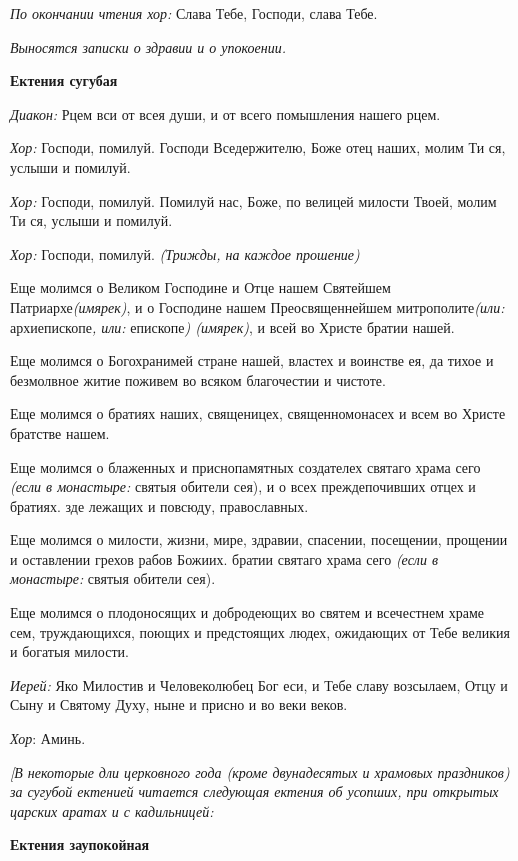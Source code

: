 {\itshape По окончании чтения хор:} Слава Тебе, Господи, слава Тебе.

{\itshape Выносятся записки о здравии и о упокоении.}

{\bfseries Ектения сугубая}

{\itshape Диакон:} Рцем вси от всея души, и от всего помышления нашего рцем.

{\itshape  Хор:} Господи, помилуй. Господи Вседержителю, Боже отец наших, молим Ти ся, услыши и помилуй.

{\itshape  Хор:} Господи, помилуй. Помилуй нас, Боже, по велицей милости Твоей, молим Ти ся, услыши и помилуй.

{\itshape  Хор:} Господи, помилуй. {\itshape (Трижды, на каждое прошение)} 

Еще молимся о Великом Господине и Отце нашем Святейшем Патриархе{\itshape  (имярек)}, и о Господине нашем Преосвященнейшем митрополите{\itshape  (или:} архиепископе{\itshape , или:} епископе{\itshape ) (имярек)}, и всей во Христе братии нашей. 

Еще молимся о Богохранимей стране нашей, властех и воинстве ея, да тихое и безмолвное житие поживем во всяком благочестии и чистоте. 

Еще молимся о братиях наших, священицех, священномонасех и всем во Христе братстве нашем.

Еще молимся о блаженных и приснопамятных создателех святаго храма сего {\itshape (если в монастыре:} святыя обители сея), и о всех преждепочивших отцех и братиях. зде лежащих и повсюду, православных. 

Еще молимся о милости, жизни, мире, здравии, спасении, посещении, прощении и оставлении грехов рабов Божиих. братии святаго храма сего {\itshape (если в монастыре:} святыя обители сея). 

Еще молимся о плодоносящих и добродеющих во святем и всечестнем храме сем, труждающихся, поющих и предстоящих людех, ожидающих от Тебе великия и богатыя милости.

{\itshape Иерей:} Яко Милостив и Человеколюбец Бог еси, и Тебе славу возсылаем, Отцу и Сыну и Святому Духу, ныне и присно и во веки веков.

{\itshape Хор}: Аминь.

{\itshape [В некоторые дли церковного года (кроме двунадесятых и храмовых праздников) за сугубой ектенией читается следующая ектения об усопших, при открытых царских аратах и с кадильницей:}

{\bfseries Ектения заупокойная }

